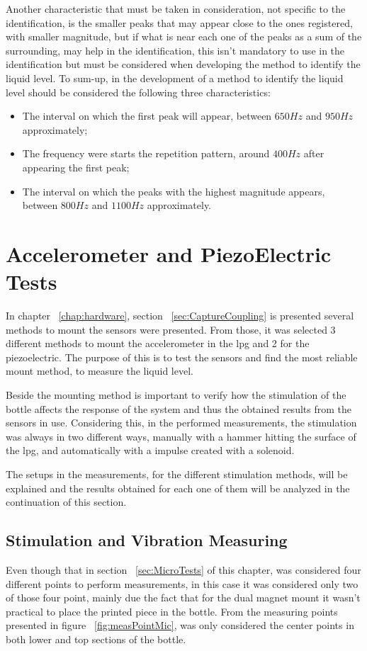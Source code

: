 Another characteristic that must be taken in consideration, not specific to the identification, is the smaller peaks that may appear close to the ones registered, with smaller magnitude, but if what is near each one of the peaks as a sum of the surrounding, may help in the identification, this isn't mandatory to use in the identification but must be considered when developing the method to identify the liquid level.
To sum-up, in the development of a method to identify the liquid level should be considered the following three characteristics:
\begin{itemize}
    \item The interval on which the first peak will appear, between $650Hz$ and $950Hz$ approximately;
    \item The frequency were starts the repetition pattern, around $400Hz$ after appearing the first peak;
    \item The interval on which the peaks with the highest magnitude appears, between $800Hz$ and $1100Hz$ approximately. 
\end{itemize}

\section{Accelerometer and PiezoElectric Tests}

In chapter ~\ref{chap:hardware}, section ~\ref{sec:CaptureCoupling} is presented several methods to mount the sensors were presented. From those, it was selected 3 different methods to mount the accelerometer in the \acrshort{lpg} and 2 for the piezoelectric. The purpose of this is to test the sensors and find the most reliable mount method, to measure the liquid level.

Beside the mounting method is important to verify how the stimulation of the bottle affects the response of the system and thus the obtained results from the sensors in use. Considering this, in the performed measurements, the stimulation was always in two different ways, manually with a hammer hitting the surface of the \acrshort{lpg}, and automatically with a impulse created with a solenoid.

The setups in the measurements, for the different stimulation methods, will be explained and the results obtained for each one of them will be analyzed in the continuation of this section.
\subsection{Stimulation and Vibration Measuring}
Even though that in section ~\ref{sec:MicroTests} of this chapter, was considered four different points to perform measurements, in this case it was considered only two of those four point, mainly due the fact that for the dual magnet mount it wasn't practical to place the printed piece in the bottle. From the measuring points presented in figure ~\ref{fig:measPointMic}, was only considered the center points in both lower and top sections of the bottle.

